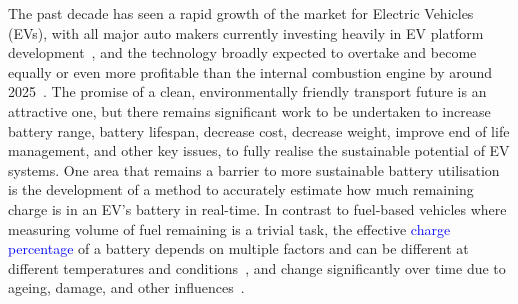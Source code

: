 %
%
The past decade has seen a rapid growth of the market for Electric Vehicles (EVs), with all major auto makers currently investing heavily in EV platform development~\cite{iea_global_2023}, and the technology broadly expected to overtake and become equally or even more profitable than the internal combustion engine by around 2025~\cite{baik_making_2019}.
The promise of a clean, environmentally friendly transport future is an attractive one, but there remains significant work to be undertaken to increase battery range, battery lifespan, decrease cost, decrease weight, improve end of life management, and other key issues, to fully realise the sustainable potential of EV systems.
One area that remains a barrier to more sustainable battery utilisation is the development of a method to accurately estimate how much remaining charge is in an EV's battery in real-time.
In contrast to fuel-based vehicles where measuring volume of fuel remaining is a trivial task, the effective \textcolor{blue}{charge percentage} of a battery depends on multiple factors and can be different at different temperatures and conditions~\cite{xing_state_2014}, and change significantly over time due to ageing, damage, and other influences~\cite{johansson_neural_2018}.

